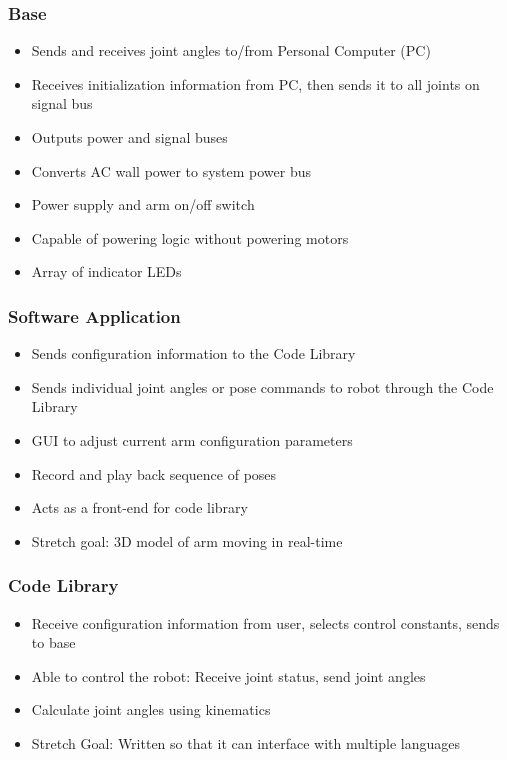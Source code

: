 \subsubsection{Base}
\begin{itemize}
	\item Sends and receives joint angles to/from Personal Computer (PC)
	\item Receives initialization information from PC, then sends it to all joints on signal bus
	\item Outputs power and signal buses
	\item Converts AC wall power to system power bus
	\item Power supply and arm on/off switch
	\item Capable of powering logic without powering motors
	\item Array of indicator LEDs
\end{itemize}

\subsubsection{Software Application}
\begin{itemize}
	\item Sends configuration information to the Code Library
	\item Sends individual joint angles or pose commands to robot through the Code Library
	\item GUI to adjust current arm configuration parameters
	\item Record and play back sequence of poses
	\item Acts as a front-end for code library
	\item Stretch goal: 3D model of arm moving in real-time
\end{itemize}

\subsubsection{Code Library}
\begin{itemize}
	\item Receive configuration information from user, selects control constants, sends to base
	\item Able to control the robot: Receive joint status, send joint angles
	\item Calculate joint angles using kinematics
	\item Stretch Goal: Written so that it can interface with multiple languages
\end{itemize}


